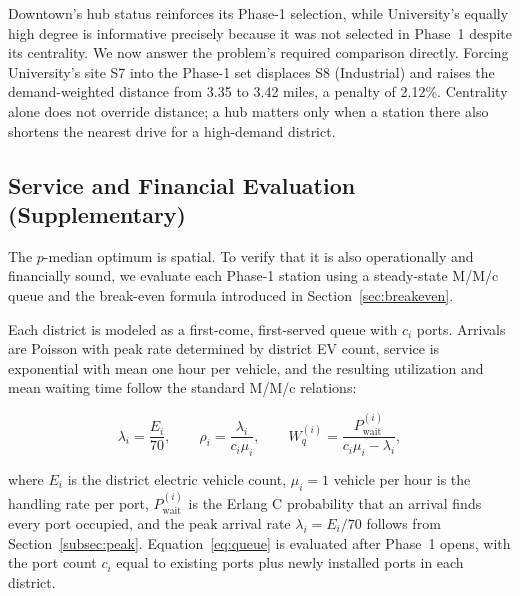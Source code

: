 \documentclass[11pt]{article}
\begin{document}
Downtown's hub status reinforces its Phase-1 selection, while University's equally high degree is informative precisely because it was not selected in Phase~1 despite its centrality. We now answer the problem's required comparison directly. Forcing University's site S7 into the Phase-1 set displaces S8 (Industrial) and raises the demand-weighted distance from 3.35 to 3.42 miles, a penalty of 2.12\%. Centrality alone does not override distance; a hub matters only when a station there also shortens the nearest drive for a high-demand district.

\subsection{Service and Financial Evaluation (Supplementary)}
\label{sec:service}

The $p$-median optimum is spatial. To verify that it is also operationally and financially sound, we evaluate each Phase-1 station using a steady-state M/M/c queue and the break-even formula introduced in Section~\ref{sec:breakeven}.

Each district is modeled as a first-come, first-served queue with $c_i$ ports. Arrivals are Poisson with peak rate determined by district EV count, service is exponential with mean one hour per vehicle, and the resulting utilization and mean waiting time follow the standard M/M/c relations:

\begin{equation}
\lambda_i = \frac{E_i}{70}, \qquad \rho_i = \frac{\lambda_i}{c_i \mu_i}, \qquad W_q^{(i)} = \frac{P_{\text{wait}}^{(i)}}{c_i \mu_i - \lambda_i},
\label{eq:queue}
\end{equation}

where $E_i$ is the district electric vehicle count, $\mu_i = 1$ vehicle per hour is the handling rate per port, $P_{\text{wait}}^{(i)}$ is the Erlang C probability that an arrival finds every port occupied, and the peak arrival rate $\lambda_i = E_i/70$ follows from Section~\ref{subsec:peak}. Equation~\eqref{eq:queue} is evaluated after Phase~1 opens, with the port count $c_i$ equal to existing ports plus newly installed ports in each district.
\end{document}
